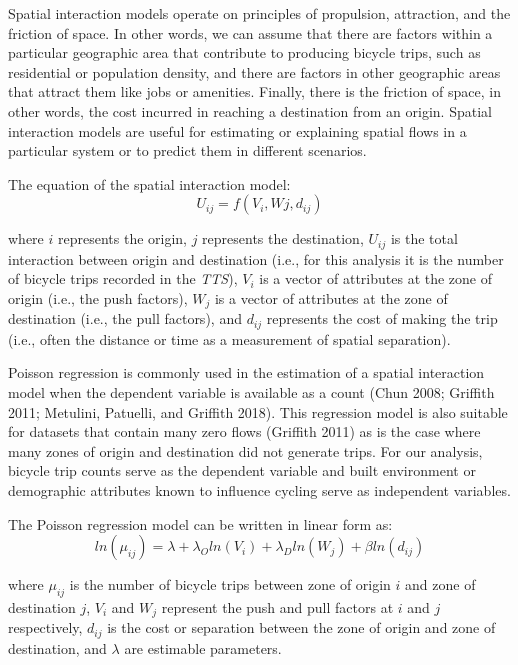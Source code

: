 \documentclass[smallextended]{svjour3}       %
\begin{document}
Spatial interaction models operate on principles of propulsion,
attraction, and the friction of space. In other words, we can assume
that there are factors within a particular geographic area that
contribute to producing bicycle trips, such as residential or population
density, and there are factors in other geographic areas that attract
them like jobs or amenities. Finally, there is the friction of space, in
other words, the cost incurred in reaching a destination from an origin.
Spatial interaction models are useful for estimating or explaining
spatial flows in a particular system or to predict them in different
scenarios.

The equation of the spatial interaction model: \[
U_{ij} = f(V_i, Wj, d_{ij})
\]

\noindent where \(i\) represents the origin, \(j\) represents the
destination, \(U_{ij}\) is the total interaction between origin and
destination (i.e., for this analysis it is the number of bicycle trips
recorded in the \emph{TTS}), \(V_i\) is a vector of attributes at the
zone of origin (i.e., the push factors), \(W_j\) is a vector of
attributes at the zone of destination (i.e., the pull factors), and
\(d_{ij}\) represents the cost of making the trip (i.e., often the
distance or time as a measurement of spatial separation).

Poisson regression is commonly used in the estimation of a spatial
interaction model when the dependent variable is available as a count
(Chun 2008; Griffith 2011; Metulini, Patuelli, and Griffith 2018). This
regression model is also suitable for datasets that contain many zero
flows (Griffith 2011) as is the case where many zones of origin and
destination did not generate trips. For our analysis, bicycle trip
counts serve as the dependent variable and built environment or
demographic attributes known to influence cycling serve as independent
variables.

The Poisson regression model can be written in linear form as: \[
ln(\mu_{ij}) = \lambda + \lambda_O ln(V_i) + \lambda_Dln(W_j) + \beta ln(d_{ij})
\]

\noindent where \(\mu_{ij}\) is the number of bicycle trips between zone
of origin \(i\) and zone of destination \(j\), \(V_i\) and \(W_j\)
represent the push and pull factors at \(i\) and \(j\) respectively,
\(d_{ij}\) is the cost or separation between the zone of origin and zone
of destination, and \(\lambda\) are estimable parameters.
\end{document}
